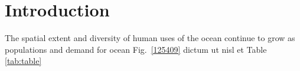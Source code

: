 \section{Introduction}
\label{introduction}

The spatial extent and diversity of human uses of the ocean continue to grow as populations and demand for ocean  Fig.~\ref{125409} dictum ut nisl et Table \ref{tab:table}

